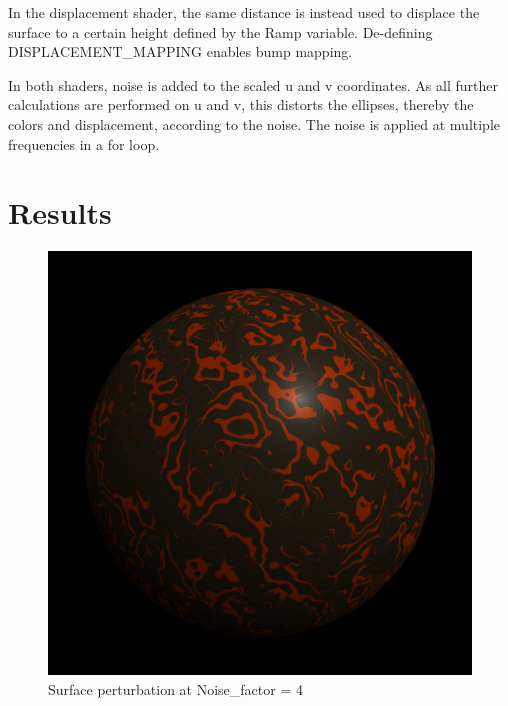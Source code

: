 \documentclass[12pt,letterpaper]{article}
\begin{document}
In the displacement shader, the same distance is instead used to displace the
surface to a certain height defined by the Ramp variable. De-defining
DISPLACEMENT\_MAPPING enables bump mapping.

In both shaders, noise is added to the scaled u and v coordinates. As all
further calculations are performed on u and v, this distorts the ellipses,
thereby the colors and displacement, according to the noise. The noise is
applied at multiple frequencies in a for loop.


\newpage
\section*{Results}

\begin{figure}[!h]
    \centering
    \includegraphics[width=1.0\textwidth]{img/surface_perturb.png}
    \caption{Surface perturbation at Noise\_factor = 4}
    \label{fig:ellipses}
\end{figure}
\end{document}
